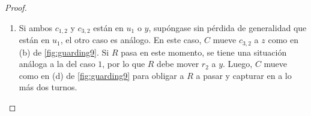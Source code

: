 \begin{proof}
\begin{enumerate}
\begin{figure}[ht!]
\begin{tcbitemize}
{\begin{tikzpicture}
                            \end{tikzpicture}
                        }
                
                \tcbitem
                    \tcblower
                \tcbitem[raster multicolumn=2]
                    \tcblower
            \end{tcbitemize}
            \captionsetup{font=footnotesize}
            \caption{En (a), $c_1$ se encuentra obstru\'ido, por lo que
            reetiqueta sus fichas como en (b). Luego, $C$ mueve como en (c), mientras que $c_{3,2}$ se
            asegura de estar en un v\'ertice adyacente a $y$ (reetiquetando en
            caso de que $c_2$ tambi\'en estuviera obstru\'ida).}
            \label{fig:guarding8}
        \end{figure}

        \item Si ambos $c_{1,2}$ y $c_{3,2}$ est\'an en $u_1$ o $y$, sup\'ongase
        sin p\'erdida de generalidad que est\'an en $u_1$, el otro caso es
        an\'alogo. En este caso, $C$ mueve $c_{3,2}$ a $z$ como en (b) de
        \cref{fig:guarding9}. Si $R$ pasa en este momento, se tiene una
        situaci\'on an\'aloga a la del caso $1$, por lo que $R$ debe mover $r_2$
        a $y$. Luego, $C$ mueve como en (d) de \cref{fig:guarding9} para obligar
        a $R$ a pasar y capturar en a lo m\'as dos turnos.


\end{enumerate}
\end{proof}
